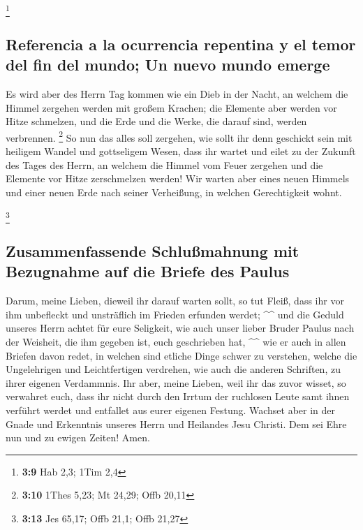\footnote{\textbf{3:9} Hab 2,3; 1Tim 2,4}

\hypertarget{referencia-a-la-ocurrencia-repentina-y-el-temor-del-fin-del-mundo-un-nuevo-mundo-emerge}{%
\subsection{Referencia a la ocurrencia repentina y el temor del fin del
mundo; Un nuevo mundo
emerge}\label{referencia-a-la-ocurrencia-repentina-y-el-temor-del-fin-del-mundo-un-nuevo-mundo-emerge}}

 Es wird aber des Herrn Tag kommen wie ein Dieb in der
Nacht, an welchem die Himmel zergehen werden mit großem Krachen; die
Elemente aber werden vor Hitze schmelzen, und die Erde und die Werke,
die darauf sind, werden verbrennen. \footnote{\textbf{3:10} 1Thes 5,23;
  Mt 24,29; Offb 20,11}  So nun das alles soll zergehen,
wie sollt ihr denn geschickt sein mit heiligem Wandel und gottseligem
Wesen,  dass ihr wartet und eilet zu der Zukunft des
Tages des Herrn, an welchem die Himmel vom Feuer zergehen und die
Elemente vor Hitze zerschmelzen werden!  Wir warten aber
eines neuen Himmels und einer neuen Erde nach seiner Verheißung, in
welchen Gerechtigkeit wohnt.

\footnote{\textbf{3:13} Jes 65,17; Offb 21,1; Offb 21,27}

\hypertarget{zusammenfassende-schluuxdfmahnung-mit-bezugnahme-auf-die-briefe-des-paulus}{%
\subsection{Zusammenfassende Schlußmahnung mit Bezugnahme auf die Briefe
des
Paulus}\label{zusammenfassende-schluuxdfmahnung-mit-bezugnahme-auf-die-briefe-des-paulus}}

 Darum, meine Lieben, dieweil ihr darauf warten sollt, so
tut Fleiß, dass ihr vor ihm unbefleckt und unsträflich im Frieden
erfunden werdet; \^{}\^{}  und die Geduld unseres Herrn
achtet für eure Seligkeit, wie auch unser lieber Bruder Paulus nach der
Weisheit, die ihm gegeben ist, euch geschrieben hat, \^{}\^{}
 wie er auch in allen Briefen davon redet, in welchen
sind etliche Dinge schwer zu verstehen, welche die Ungelehrigen und
Leichtfertigen verdrehen, wie auch die anderen Schriften, zu ihrer
eigenen Verdammnis.  Ihr aber, meine Lieben, weil ihr das
zuvor wisset, so verwahret euch, dass ihr nicht durch den Irrtum der
ruchlosen Leute samt ihnen verführt werdet und entfallet aus eurer
eigenen Festung.  Wachset aber in der Gnade und
Erkenntnis unseres Herrn und Heilandes Jesu Christi. Dem sei Ehre nun
und zu ewigen Zeiten! Amen.
